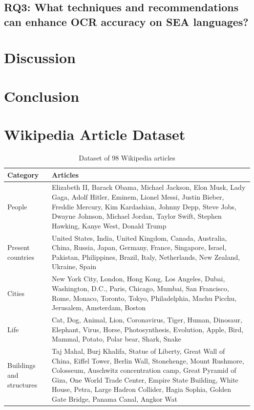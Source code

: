 \documentclass[12pt,oneside]{memoir}
\begin{document}
\section{RQ3: What techniques and recommendations can enhance OCR accuracy on SEA languages?}

\chapter{Discussion}

\chapter{Conclusion}

\printbibliography[title={References}]

\clearpage
\appendix
\renewcommand{\chaptername}{Appendix}

\chapter{Wikipedia Article Dataset}

\begin{table}[ht]
    \centering
    \begin{tabular}{p{1in}p{3.8in}}
        \toprule
        \textbf{Category} & \textbf{Articles} \\
        \midrule
        People & Elizabeth II, Barack Obama, Michael Jackson, Elon Musk, Lady Gaga, Adolf Hitler, Eminem, Lionel Messi, Justin Bieber, Freddie Mercury, Kim Kardashian, Johnny Depp, Steve Jobs, Dwayne Johnson, Michael Jordan, Taylor Swift, Stephen Hawking, Kanye West, Donald Trump\\
        \midrule
        Present countries & United States, India, United Kingdom, Canada, Australia, China, Russia, Japan, Germany, France, Singapore, Israel, Pakistan, Philippines, Brazil, Italy, Netherlands, New Zealand, Ukraine, Spain\\
        \midrule
        Cities & New York City, London, Hong Kong, Los Angeles, Dubai, Washington, D.C., Paris, Chicago, Mumbai, San Francisco, Rome, Monaco, Toronto, Tokyo, Philadelphia, Machu Picchu, Jerusalem, Amsterdam, Boston\\
        \midrule
        Life & Cat, Dog, Animal, Lion, Coronavirus, Tiger, Human, Dinosaur, Elephant, Virus, Horse, Photosynthesis, Evolution, Apple, Bird, Mammal, Potato, Polar bear, Shark, Snake\\
        \midrule
        Buildings and structures & Taj Mahal, Burj Khalifa, Statue of Liberty, Great Wall of China, Eiffel Tower, Berlin Wall, Stonehenge, Mount Rushmore, Colosseum, Auschwitz concentration camp, Great Pyramid of Giza, One World Trade Center, Empire State Building, White House, Petra, Large Hadron Collider, Hagia Sophia, Golden Gate Bridge, Panama Canal, Angkor Wat\\
        \bottomrule
    \end{tabular}
    \caption{Dataset of 98 Wikipedia articles}
    \label{table:dataset}
\end{table}
\end{document}
